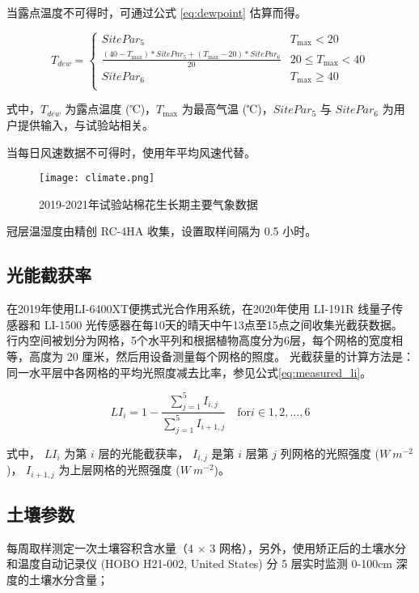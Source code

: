 当露点温度不可得时，可通过公式 \ref{eq:dewpoint} 估算而得。

\begin{equation}\label{eq:dewpoint}
    T_{dew} = \begin{cases}
        SitePar_5                                                            & T_{\max} < 20        \\
        \frac{(40 - T_{\max}) * SitePar_5 + (T_{\max} - 20) * SitePar_6}{20} & 20 \le T_{\max} < 40 \\
        SitePar_6                                                            & T_{\max} \ge 40      \\
    \end{cases}
\end{equation}

式中，$T_{dew}$ 为露点温度 (℃)，$T_{\max}$ 为最高气温 (℃)，$SitePar_5$ 与 $SitePar_6$ 为用户提供输入，与试验站相关。

当每日风速数据不可得时，使用年平均风速代替。

\begin{figure}
    \centering
    \texttt{[image: climate.png]}
    \caption{2019{-}2021年试验站棉花生长期主要气象数据}
\end{figure}

冠层温湿度由精创 RC-4HA 收集，设置取样间隔为 0.5 小时。

\subsection{光能截获率}

在2019年使用LI-6400XT便携式光合作用系统，在2020年使用 LI-191R 线量子传感器和 LI-1500 光传感器在每10天的晴天中午13点至15点之间收集光截获数据。
行内空间被划分为网格，5个水平列和根据植物高度分为6层，每个网格的宽度相等，高度为 20 厘米，然后用设备测量每个网格的照度。
光截获量的计算方法是：同一水平层中各网格的平均光照度减去比率，参见公式\ref{eq:measured_li}。

\begin{equation}\label{eq:measured_li}
    LI_{i} = 1 - \frac{\sum^5_{j=1} I_{i,j}}{\sum^5_{j=1} I_{i+1,j}} \quad \mathrm{for} i \in {1,2,\dots,6}
\end{equation}

式中， $LI_{i}$ 为第 $i$ 层的光能截获率， $I_{i,j}$ 是第 $i$ 层第 $j$ 列网格的光照强度 ($W\ m^{-2}$)， $I_{i+1,j}$ 为上层网格的光照强度 ($W\ m^{-2}$)。

\subsection{土壤参数}
每周取样测定一次土壤容积含水量（4 $\times$ 3 网格），另外，使用矫正后的土壤水分和温度自动记录仪 (HOBO H21-002, United States) 分 5 层实时监测 0-100cm 深度的土壤水分含量；

